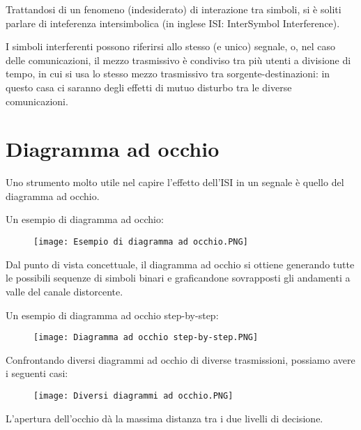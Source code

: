 Trattandosi di un fenomeno (indesiderato) di interazione tra simboli, si è soliti parlare di inteferenza intersimbolica (in inglese ISI: InterSymbol Interference). \newline 

I simboli interferenti possono riferirsi allo stesso (e unico) segnale, o, nel caso delle comunicazioni, il mezzo trasmissivo è condiviso tra più utenti a divisione di tempo, 
in cui si usa lo stesso mezzo trasmissivo tra sorgente-destinazioni: in questo casa ci saranno degli effetti di mutuo disturbo tra le diverse comunicazioni. \newline 

\newpage 

\section{Diagramma ad occhio} 

Uno strumento molto utile nel capire l'effetto dell'ISI in un segnale è quello del diagramma ad occhio. \newline 

Un esempio di diagramma ad occhio: 

\begin{figure}[h]
    \centering
    \texttt{[image: Esempio di diagramma ad occhio.PNG]}
\end{figure} 

Dal punto di vista concettuale, il diagramma ad occhio si ottiene generando tutte le possibili sequenze di simboli binari e graficandone sovrapposti gli andamenti a valle del canale distorcente. \newline 

Un esempio di diagramma ad occhio step-by-step: 

\begin{figure}[h]
    \centering
    \texttt{[image: Diagramma ad occhio step-by-step.PNG]}
\end{figure} 

Confrontando diversi diagrammi ad occhio di diverse trasmissioni, possiamo avere i seguenti casi: 

\begin{figure}[h]
    \centering
    \texttt{[image: Diversi diagrammi ad occhio.PNG]}
\end{figure} 

\newpage 

L'apertura dell'occhio dà la massima distanza tra i due livelli di decisione. \newline 

